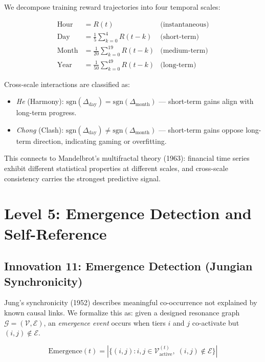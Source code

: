 \documentclass{article}
\begin{document}
We decompose training reward trajectories into four temporal scales:

\begin{align}
    \text{Hour} &= R(t) & \text{(instantaneous)} \\
    \text{Day}  &= \frac{1}{5}\sum_{k=0}^{4} R(t-k) & \text{(short-term)} \\
    \text{Month} &= \frac{1}{20}\sum_{k=0}^{19} R(t-k) & \text{(medium-term)} \\
    \text{Year} &= \frac{1}{50}\sum_{k=0}^{49} R(t-k) & \text{(long-term)}
\end{align}

Cross-scale interactions are classified as:
\begin{itemize}
    \item \emph{He} (Harmony): $\text{sgn}(\Delta_{\text{day}}) = \text{sgn}(\Delta_{\text{month}})$ --- short-term gains align with long-term progress.
    \item \emph{Chong} (Clash): $\text{sgn}(\Delta_{\text{day}}) \neq \text{sgn}(\Delta_{\text{month}})$ --- short-term gains oppose long-term direction, indicating gaming or overfitting.
\end{itemize}

This connects to Mandelbrot's multifractal theory (1963): financial time series exhibit different statistical properties at different scales, and cross-scale consistency carries the strongest predictive signal.

\section{Level 5: Emergence Detection and Self-Reference}
\label{sec:emergence}

\subsection{Innovation 11: Emergence Detection (Jungian Synchronicity)}

Jung's synchronicity (1952) describes meaningful co-occurrence not explained by known causal links. We formalize this as: given a designed resonance graph $\mathcal{G} = (\mathcal{V}, \mathcal{E})$, an \emph{emergence event} occurs when tiers $i$ and $j$ co-activate but $(i,j) \notin \mathcal{E}$.

\begin{equation}
    \text{Emergence}(t) = |\{(i,j) : i,j \in \mathcal{V}_{\text{active}}^{(t)}, \; (i,j) \notin \mathcal{E}\}|
\end{equation}
\end{document}
